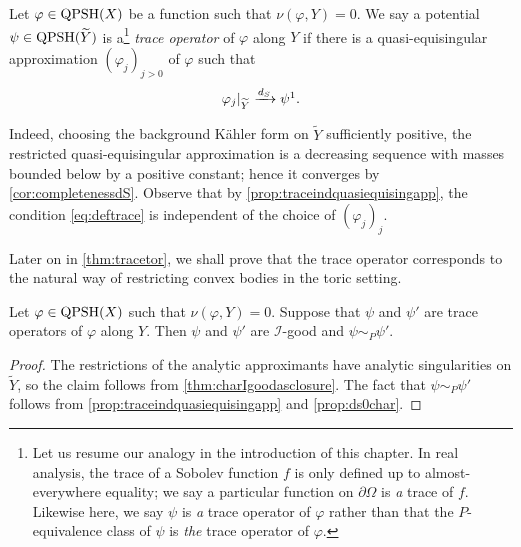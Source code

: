 \begin{definition}\label{def:traceop}
    Let $\varphi\in \mathrm{QPSH}(X)$ be a function such that $\nu(\varphi,Y)=0$. We say a potential $\psi\in \mathrm{QPSH}(\widetilde{Y})$ is a\footnote{Let us resume our analogy in the introduction of this chapter.
In real analysis, the trace of a Sobolev function $f$ is only defined up to almost-everywhere equality; we say a particular function on $\partial\Omega$ is \emph{a} trace of $f$. Likewise here, we say $\psi$ is \emph{a} trace operator of $\varphi$ rather than that the $P$-equivalence class of $\psi$ is \emph{the} trace operator of $\varphi$.} \emph{trace operator} of $\varphi$ along $Y$ if there is a quasi-equisingular approximation $(\varphi_j)_{j>0}$ of $\varphi$ such that
    \begin{equation}\label{eq:deftrace}
        \varphi_j|_{\widetilde{Y}}\xrightarrow{d_S}\psi\footnotemark.
    \end{equation}
\end{definition}
Indeed, choosing the background Kähler form on $\widetilde{Y}$ sufficiently positive, the restricted quasi-equisingular approximation is a decreasing sequence with masses bounded below by a positive constant; hence it converges by \cref{cor:completenessdS}.
Observe that by \cref{prop:traceindquasiequisingapp}, the condition \eqref{eq:deftrace} is independent of the choice of $(\varphi_j)_j$.

Later on in \cref{thm:tracetor}, we shall prove that the trace operator corresponds to the natural way of restricting convex bodies in the toric setting.

\begin{proposition}\label{prop:traceunique}
    Let $\varphi\in \mathrm{QPSH}(X)$ such that $\nu(\varphi,Y)=0$. Suppose that $\psi$ and $\psi'$ are trace operators of $\varphi$ along $Y$. Then $\psi$ and $\psi'$ are $\mathcal{I}$-good and $\psi\sim_P\psi'$.
\end{proposition}
\begin{proof}
    The restrictions of the analytic approximants have analytic singularities on $\widetilde{Y}$, so the claim follows from \cref{thm:charIgoodasclosure}. The fact that $\psi\sim_P\psi'$ follows from \cref{prop:traceindquasiequisingapp} and \cref{prop:ds0char}.
\end{proof}

